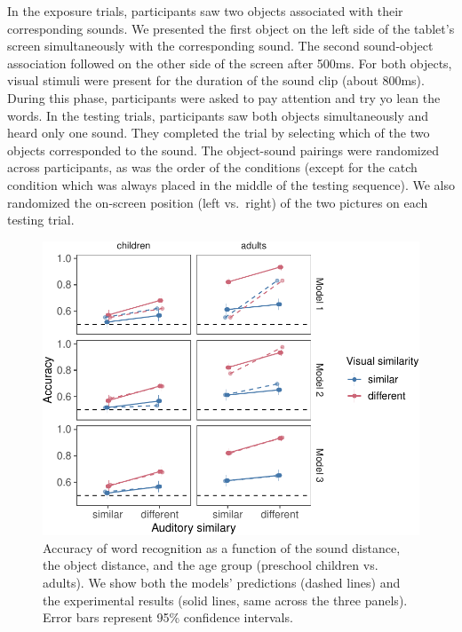 \documentclass[english,,man]{apa6}
\begin{document}
In the exposure trials, participants saw two objects associated with their corresponding sounds. We presented the first object on the left side of the tablet's screen simultaneously with the corresponding sound. The second sound-object association followed on the other side of the screen after 500ms. For both objects, visual stimuli were present for the duration of the sound clip (about 800ms). During this phase, participants were asked to pay attention and try yo lean the words. In the testing trials, participants saw both objects simultaneously and heard only one sound. They completed the trial by selecting which of the two objects corresponded to the sound. The object-sound pairings were randomized across participants, as was the order of the conditions (except for the catch condition which was always placed in the middle of the testing sequence). We also randomized the on-screen position (left vs.~right) of the two pictures on each testing trial.

\begin{figure}[h]

{\centering \includegraphics{ms_blind_files/figure-latex/allData-1} 

}

\caption{Accuracy of word recognition as a function of the sound distance, the object distance, and the age group (preschool children vs. adults). We show both the models' predictions (dashed lines) and the experimental results (solid lines, same across the three panels). Error bars represent 95\% confidence intervals.}\label{fig:allData}
\end{figure}
\end{document}
